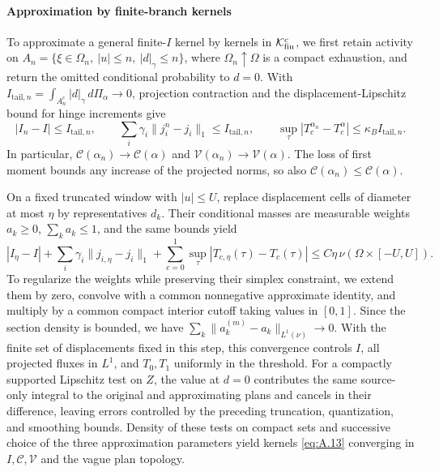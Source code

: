 \paragraph{Approximation by finite-branch kernels}
\label{par:finite-branch-approximation}
To approximate a general finite-\(I\) kernel by kernels in \(\mathcal K_{\rm fin}^c\), we first retain activity on \(A_n=\{\xi\in\Omega_n,\ |u|\le n,\ |d|_\gamma\le n\}\), where \(\Omega_n\uparrow\Omega\) is a compact exhaustion, and return the omitted conditional probability to \(d=0\). With \(I_{\mathrm{tail},n}=\int_{A_n^c}|d|_\gamma\,d\Pi_\alpha\to0\), projection contraction and the displacement-Lipschitz bound for hinge increments give
\begin{equation}
|I_n-I|\le I_{\mathrm{tail},n},\qquad
\sum_i\gamma_i\|j_i^n-j_i\|_1\le I_{\mathrm{tail},n},\qquad
\sup_\tau|T_c^{\alpha_n}-T_c^\alpha|\le \kappa_BI_{\mathrm{tail},n}.
\tag{A.17}\label{eq:A.17}
\end{equation}
In particular, \(\mathcal C(\alpha_n)\to\mathcal C(\alpha)\) and \(\mathcal V(\alpha_n)\to\mathcal V(\alpha)\). The loss of first moment bounds any increase of the projected norms, so also \(\mathcal C(\alpha_n)\le\mathcal C(\alpha)\).

On a fixed truncated window with \(|u|\le U\), replace displacement cells of diameter at most \(\eta\) by representatives \(d_k\). Their conditional masses are measurable weights \(a_k\ge0\), \(\sum_k a_k\le1\), and the same bounds yield
\begin{equation}
|I_\eta-I|+\sum_i\gamma_i\|j_{i,\eta}-j_i\|_1
+\sum_{c=0}^1\sup_\tau|T_{c,\eta}(\tau)-T_c(\tau)|
\le C\eta\,\nu(\Omega\times[-U,U]).
\tag{A.18}\label{eq:A.18}
\end{equation}
To regularize the weights while preserving their simplex constraint, we extend them by zero, convolve with a common nonnegative approximate identity, and multiply by a common compact interior cutoff taking values in \([0,1]\). Since the section density is bounded, we have \(\sum_k\|a_k^{(m)}-a_k\|_{L^1(\nu)}\to0\). With the finite set of displacements fixed in this step, this convergence controls \(I\), all projected fluxes in \(L^1\), and \(T_0,T_1\) uniformly in the threshold. For a compactly supported Lipschitz test on \(Z\), the value at \(d=0\) contributes the same source-only integral to the original and approximating plans and cancels in their difference, leaving errors controlled by the preceding truncation, quantization, and smoothing bounds. Density of these tests on compact sets and successive choice of the three approximation parameters yield kernels \eqref{eq:A.13} converging in \(I,\mathcal C,\mathcal V\) and the vague plan topology.

